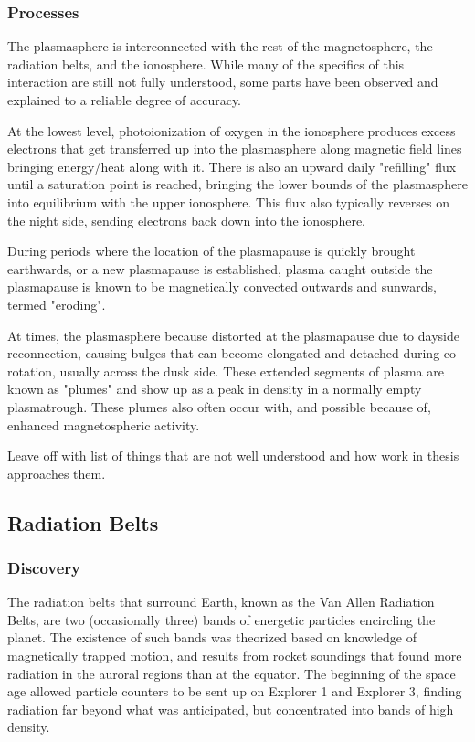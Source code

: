 \subsubsection{Processes}
The plasmasphere is interconnected with the rest of the magnetosphere, the radiation belts, and the ionosphere. While many of the specifics of this interaction are still not fully understood, some parts have been observed and explained to a reliable degree of accuracy. 

At the lowest level, photoionization of oxygen in the ionosphere produces excess electrons that get transferred up into the plasmasphere along magnetic field lines bringing energy/heat along with it. There is also an upward daily "refilling" flux until a saturation point is reached, bringing the lower bounds of the plasmasphere into equilibrium with the upper ionosphere. This flux also typically reverses on the night side, sending electrons back down into the ionosphere.

During periods where the location of the plasmapause is quickly brought earthwards, or a new plasmapause is established, plasma caught outside the plasmapause is known to be magnetically convected outwards and sunwards\cite{ErosionRecoveryPlasmasphere}, termed "eroding". 

At times, the plasmasphere because distorted at the plasmapause due to dayside reconnection, causing bulges that can become elongated and detached during co-rotation, usually across the dusk side. These extended segments of plasma are known as "plumes" and show up as a peak in density in a normally empty plasmatrough. These plumes also often occur with, and possible because of, enhanced magnetospheric activity\cite{EvolutionPlasmasphericIons}.


\note Leave off with list of things that are not well understood and how work in thesis approaches them.

\subsection{Radiation Belts}

\subsubsection{Discovery}
The radiation belts that surround Earth, known as the Van Allen Radiation Belts, are two (occasionally three\cite{LinksBetweenPlasmapauseRadiationBelt}) bands of energetic particles encircling the planet. The existence of such bands was theorized based on knowledge of magnetically trapped motion, and results from rocket soundings that found more radiation in the auroral regions than at the equator.  The beginning of the space age allowed particle counters to be sent up on Explorer 1 and Explorer 3, finding radiation far beyond what was anticipated, but concentrated into bands of high density\cite{MagnetoHistory}.

